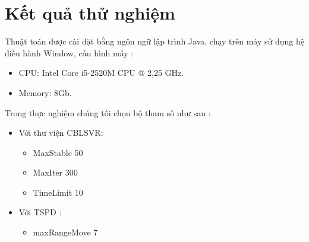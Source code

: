 \documentclass[a4paper,12pt]{report}
\begin{document}
\section{Kết quả thử nghiệm}
Thuật toán được cài đặt bằng ngôn ngữ lập trình Java, chạy trên máy sử dụng hệ điều hành Window, cấu hình máy :
\begin{itemize}
\item CPU: Intel Core i5-2520M CPU @ 2,25 GHz.
\item Memory: 8Gb.
\end{itemize}
Trong thực nghiệm chúng tôi chọn bộ tham số như sau : 
\begin{itemize}
\item Với thư viện CBLSVR: \begin{itemize}
\item MaxStable 50
\item MaxIter 300
\item TimeLimit 10
\end{itemize}
\item Với TSPD : \begin{itemize}
\item maxRangeMove 7
\end{itemize}
\end{itemize}
\end{document}
